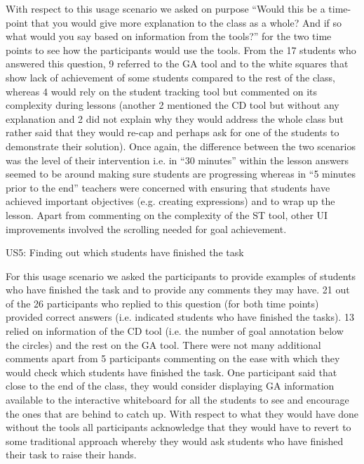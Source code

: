 With respect to this usage scenario we asked on purpose “Would this be
a time-point that you would give more explanation to the class as a
whole? And if so what would you say based on information from the
tools?” for the two time points to see how the participants would use
the tools. From the 17 students who answered this question, 9 referred
to the GA tool and to the white squares that show lack of achievement
of some students compared to the rest of the class, whereas 4 would
rely on the student tracking tool but commented on its complexity
during lessons (another 2 mentioned the CD tool but without any
explanation and 2 did not explain why they would address the whole
class but rather said that they would re-cap and perhaps ask for one
of the students to demonstrate their solution).  Once again, the
difference between the two scenarios was the level of their
intervention i.e. in “30 minutes” within the lesson answers seemed to
be around making sure students are progressing whereas in “5 minutes
prior to the end” teachers were concerned with ensuring that students
have achieved important objectives (e.g. creating expressions) and to
wrap up the lesson. Apart from commenting on the complexity of the ST
tool, other UI improvements involved the scrolling needed for goal
achievement. 

US5: Finding out which students have finished the task

For this usage scenario we asked the participants to provide examples
of students who have finished the task and to provide any comments
they may have. 21 out of the 26 participants who replied to this
question (for both time points) provided correct answers
(i.e. indicated students who have finished the tasks). 13 relied on
information of the CD tool (i.e. the number of goal annotation below
the circles) and the rest on the GA tool. There were not many
additional comments apart from 5 participants commenting on the ease
with which they would check which students have finished the task. One
participant said that close to the end of the class, they would
consider displaying GA information available to the interactive
whiteboard for all the students to see and encourage the ones that are
behind to catch up. With respect to what they would have done without
the tools all participants acknowledge that they would have to revert
to some traditional approach whereby they would ask students who have
finished their task to raise their hands.  

